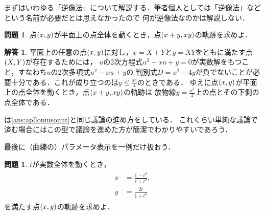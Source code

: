 \documentclass[11pt,a4paper]{ltjsarticle}
\newcommand*{\coord}[1]{\paren{#1}}
\theoremstyle{definition}
\newtheorem{que}[dfn]{問題}
\newtheorem{ans}[dfn]{解答}
\begin{document}
まずはいわゆる「逆像法」について解説する．筆者個人としては「逆像法」などという名前が必要だとは思えなかったので
何が逆像法なのかは解説しない．

\begin{que} \label{que:invimage}
	点$\coord{x,y}$が平面上の点全体を動くとき，点$\coord{x+y, xy}$の軌跡を求めよ．
\end{que}

\begin{ans} \label{ans:invimage}
	平面上の任意の点$\coord{x,y}$に対し，$x = X + Y$と$y = XY$をともに満たす点$\coord{X,Y}$が存在するためには，
	$u$の2次方程式$u^2 - xu + y = 0$が実数解をもつこと，すなわち$u$の2次多項式$u^2 - xu + y$の
	判別式$D = x^2 - 4y$が負でないことが必要十分である．これが成り立つのは$y \leq \frac{x^2}{4}$のときである．
	ゆえに点$\coord{x, y}$が平面上の点全体を動くとき，点$\coord{x+y, xy}$の軌跡は
	放物線$y = \frac{x^2}{4}$上の点とその下側の点全体である．
\end{ans}

は\cref{ans:aplloniusomit}と同じ議論の進め方をしている．
これくらい単純な議論で済む場合にはこの型で議論を進めた方が簡潔でわかりやすいであろう．

最後に（曲線の）パラメータ表示を一例だけ扱おう．

\begin{que} \label{que:parameter}
	$t$が実数全体を動くとき，
	\begin{align}
		\begin{aligned}
			x & = \frac{1 - t^2}{1 + t^2}, \\
			y & = \frac{2t}{1 + t^2}
		\end{aligned}
		\label{eq:parameter}
	\end{align}
	を満たす点$\coord{x, y}$の軌跡を求めよ．
\end{que}
\end{document}
